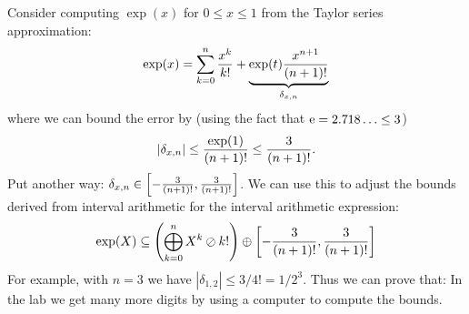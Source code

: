 \begin{example} Consider computing $\exp(x)$ for $0 \ensuremath{\leq} x \ensuremath{\leq} 1$ from the Taylor series approximation:
\[
\exp(x) = \sum_{k=0}^n {x^k \over k!} + \underbrace{\exp(t){x^{n+1} \over (n+1)!}}_{\ensuremath{\delta}_{x,n}}
\]
where we can bound the error by (using the fact that ${\rm e} = 2.718\ldots \leq 3$)
\[
|\ensuremath{\delta}_{x,n}| \ensuremath{\leq} {\exp(1) \over (n+1)!} \ensuremath{\leq} {3 \over (n+1)!}.
\]
Put another way: $\ensuremath{\delta}_{x,n} \ensuremath{\in} \left[-{3 \over (n+1)!}, {3 \over (n+1)!}\right]$. We can use this to adjust the bounds derived from interval arithmetic for the interval arithmetic expression:
\[
\exp(X) \ensuremath{\subseteq} \left(\ensuremath{\bigoplus}_{k=0}^n {X^k \ensuremath{\oslash} k!}\right) \ensuremath{\oplus} \left[-{3 \over (n+1)!}, {3 \over (n+1)!}\right]
\]
For example, with $n = 3$ we have $|\ensuremath{\delta}_{1,2}| \ensuremath{\leq} 3/4! = 1/2^3$. Thus we can prove that:
In the lab we get many more digits by using a computer to compute the bounds. \end{example}



